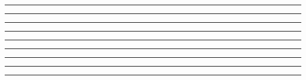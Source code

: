 \documentclass[10pt,landscape,a4paper]{article}
\begin{document}
\small
\begin{multicols*}{5}
	
\setcounter{section}{10}
 \hrule
 \hrule
 \hrule
 \hrule
 \hrule
 \hrule
 \hrule
 \hrule
 \hrule


\end{multicols*}
\end{document}
